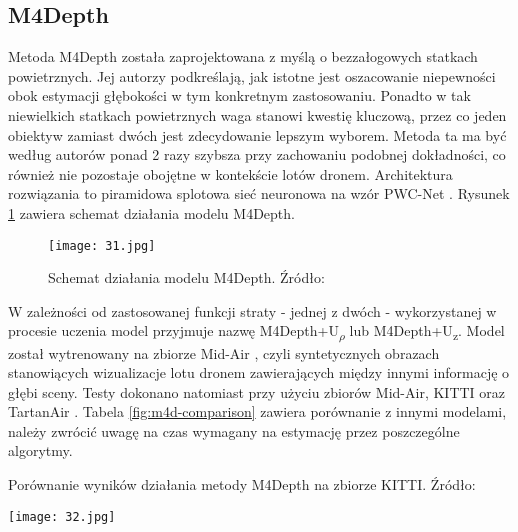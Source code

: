 \subsection{M4Depth}
Metoda M4Depth \cite{fonder2023technique} została zaprojektowana z myślą o bezzałogowych statkach powietrznych. Jej autorzy podkreślają, jak istotne jest oszacowanie niepewności obok estymacji głębokości w tym konkretnym zastosowaniu. Ponadto w tak niewielkich statkach powietrznych waga stanowi kwestię kluczową, przez co jeden obiektyw zamiast dwóch jest zdecydowanie lepszym wyborem. Metoda ta ma być według autorów ponad 2 razy szybsza przy zachowaniu podobnej dokładności, co również nie pozostaje obojętne w kontekście lotów dronem. Architektura rozwiązania to piramidowa splotowa sieć neuronowa na wzór PWC-Net \cite{sun2018pwcnet}. Rysunek \ref{fig:m4d-schema} zawiera schemat działania modelu M4Depth.
\begin{figure}[H]
    \centering
    \texttt{[image: 31.jpg]}
    \caption{Schemat działania modelu M4Depth. Źródło: \cite{fonder2023technique}}
    \label{fig:m4d-schema}
\end{figure}
W zależności od zastosowanej funkcji straty - jednej z dwóch - wykorzystanej w procesie uczenia model przyjmuje nazwę M4Depth+U\textsubscript{$\rho$} lub M4Depth+U\textsubscript{z}.
Model został wytrenowany na zbiorze Mid-Air \cite{fonder2019midair}, czyli syntetycznych obrazach stanowiących wizualizacje lotu dronem zawierających między innymi informację o głębi sceny. Testy dokonano natomiast przy użyciu zbiorów Mid-Air, KITTI oraz TartanAir \cite{wang2020tartanair}. Tabela \ref{fig:m4d-comparison} zawiera porównanie z innymi modelami, należy zwrócić uwagę na czas wymagany na estymację przez poszczególne algorytmy.
\begin{table}[H]
    \centering
    \caption{Porównanie wyników działania metody M4Depth na zbiorze KITTI. Źródło: \cite{fonder2023technique}}
    \texttt{[image: 32.jpg]}
    \label{fig:m4d-comparison}
\end{table}

